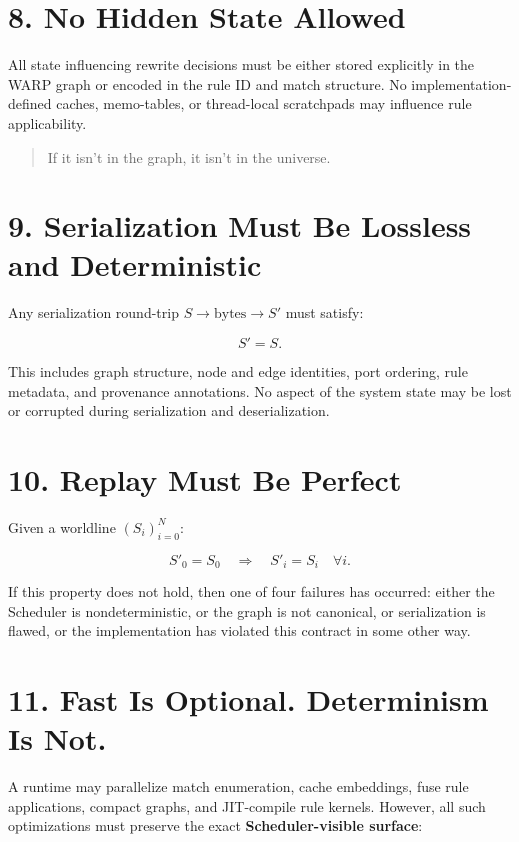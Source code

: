 \section{8. No Hidden State Allowed}

All state influencing rewrite decisions must be either stored explicitly in the WARP graph or encoded
in the rule ID and match structure. No implementation-defined caches, memo-tables, or thread-local
scratchpads may influence rule applicability.

\begin{quote}
If it isn't in the graph, it isn't in the universe.
\end{quote}

\section{9. Serialization Must Be Lossless and Deterministic}

Any serialization round-trip $S \to \text{bytes} \to S'$ must satisfy:

\[
S' = S.
\]

This includes graph structure, node and edge identities, port ordering, rule metadata, and provenance
annotations. No aspect of the system state may be lost or corrupted during serialization and
deserialization.

\section{10. Replay Must Be Perfect}

Given a worldline $(S_i)_{i=0}^N$:

\[
S'_0 = S_0 \quad \Rightarrow \quad S'_i = S_i \quad \forall i.
\]

If this property does not hold, then one of four failures has occurred: either the Scheduler is
nondeterministic, or the graph is not canonical, or serialization is flawed, or the implementation
has violated this contract in some other way.

\section{11. Fast Is Optional. Determinism Is Not.}

A runtime may parallelize match enumeration, cache embeddings, fuse rule applications, compact graphs,
and JIT-compile rule kernels. However, all such optimizations must preserve the exact
\textbf{Scheduler-visible surface}:

